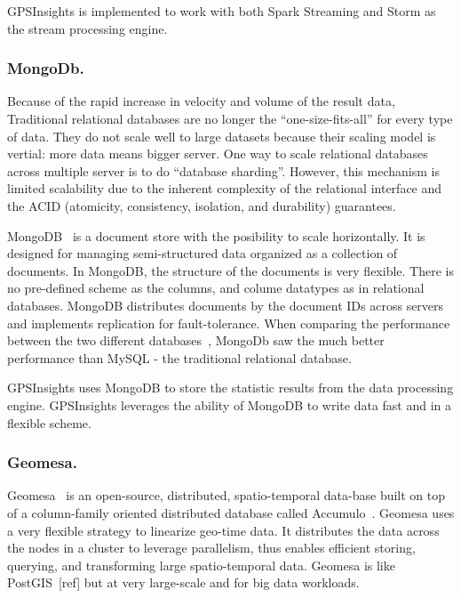 \documentclass{acm_proc_article-sp}
\begin{document}
GPSInsights is implemented to work with both Spark Streaming and Storm as the stream processing engine.

\subsubsection{MongoDb.}


Because of the rapid increase in velocity and volume of the result data, Traditional relational databases are no longer the ``one-size-fits-all'' for every type of data. They do not scale well to large datasets because their scaling model is vertial: more data means bigger server. One way to scale relational databases across multiple server is to do ``database sharding''. However, this mechanism is limited scalability due to the inherent complexity of the relational interface and the ACID (atomicity, consistency, isolation, and durability) guarantees. 

MongoDB~\cite{mongodbweb} is a document store with the posibility to scale horizontally. It is designed for managing semi-structured data organized as a collection of documents. In MongoDB, the structure of the documents is very flexible. There is no pre-defined scheme as the columns, and colume datatypes as in relational databases. MongoDB distributes documents by the document IDs across servers and implements replication for fault-tolerance. When comparing the performance between the two different databases~\cite{10.11648/j.ajsea.20150402.12}, MongoDb saw the much better performance than MySQL - the traditional relational database.

GPSInsights uses MongoDB to store the statistic results from the data processing engine. GPSInsights leverages the ability of MongoDB to write data fast and in a flexible scheme. 

\subsubsection{Geomesa.}
 
Geomesa~\cite{fox2013spatio} is an open-source, distributed, spatio-temporal data-base built on top of a column-family oriented distributed database called Accumulo~\cite{accumuloonline}. Geomesa uses a very flexible strategy to linearize geo-time data. It distributes the data across the nodes in a cluster to leverage parallelism, thus enables efficient storing, querying, and transforming large spatio-temporal data. Geomesa is like PostGIS~[ref] but at very large-scale and for big data workloads. 
\end{document}
